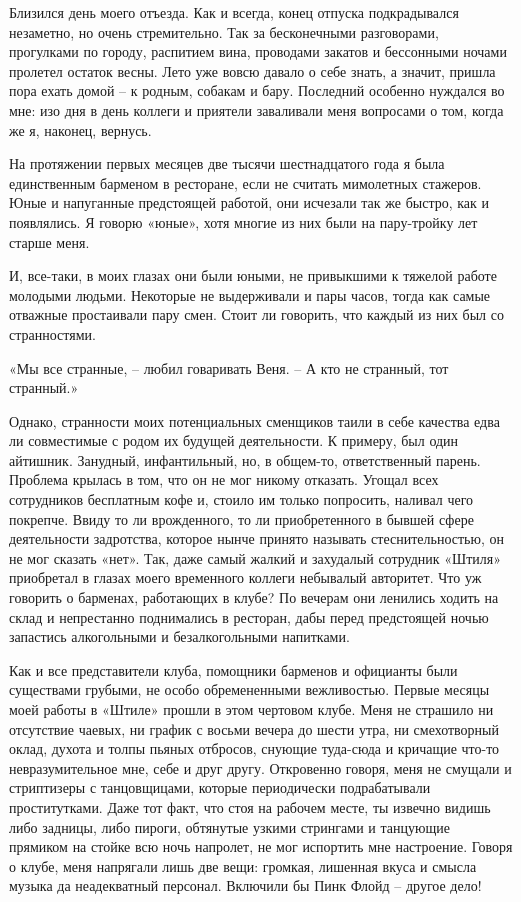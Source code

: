 \documentclass[
]{book}
\begin{document}
Близился день моего отъезда. Как и всегда, конец отпуска подкрадывался незаметно, но очень стремительно. Так за бесконечными разговорами, прогулками по городу, распитием вина, проводами закатов и бессонными ночами пролетел остаток весны. Лето уже вовсю давало о себе знать, а значит, пришла пора ехать домой -- к родным, собакам и бару. Последний особенно нуждался во мне: изо дня в день коллеги и приятели заваливали меня вопросами о том, когда же я, наконец, вернусь.

На протяжении первых месяцев две тысячи шестнадцатого года я была единственным барменом в ресторане, если не считать мимолетных стажеров. Юные и напуганные предстоящей работой, они исчезали так же быстро, как и появлялись. Я говорю «юные», хотя многие из них были на пару-тройку лет старше меня.

И, все-таки, в моих глазах они были юными, не привыкшими к тяжелой работе молодыми людьми. Некоторые не выдерживали и пары часов, тогда как самые отважные простаивали пару смен. Стоит ли говорить, что каждый из них был со странностями.

«Мы все странные, -- любил говаривать Веня. -- А кто не странный, тот странный.»

Однако, странности моих потенциальных сменщиков таили в себе качества едва ли совместимые с родом их будущей деятельности. К примеру, был один айтишник. Занудный, инфантильный, но, в общем-то, ответственный парень. Проблема крылась в том, что он не мог никому отказать. Угощал всех сотрудников бесплатным кофе и, стоило им только попросить, наливал чего покрепче. Ввиду то ли врожденного, то ли приобретенного в бывшей сфере деятельности задротства, которое нынче принято называть стеснительностью, он не мог сказать «нет». Так, даже самый жалкий и захудалый сотрудник «Штиля» приобретал в глазах моего временного коллеги небывалый авторитет. Что уж говорить о барменах, работающих в клубе? По вечерам они ленились ходить на склад и непрестанно поднимались в ресторан, дабы перед предстоящей ночью запастись алкогольными и безалкогольными напитками.

Как и все представители клуба, помощники барменов и официанты были существами грубыми, не особо обремененными вежливостью. Первые месяцы моей работы в «Штиле» прошли в этом чертовом клубе. Меня не страшило ни отсутствие чаевых, ни график с восьми вечера до шести утра, ни смехотворный оклад, духота и толпы пьяных отбросов, снующие туда-сюда и кричащие что-то невразумительное мне, себе и друг другу. Откровенно говоря, меня не смущали и стриптизеры с танцовщицами, которые периодически подрабатывали проститутками. Даже тот факт, что стоя на рабочем месте, ты извечно видишь либо задницы, либо пироги, обтянутые узкими стрингами и танцующие прямиком на стойке всю ночь напролет, не мог испортить мне настроение. Говоря о клубе, меня напрягали лишь две вещи: громкая, лишенная вкуса и смысла музыка да неадекватный персонал. Включили бы Пинк Флойд -- другое дело!
\end{document}

